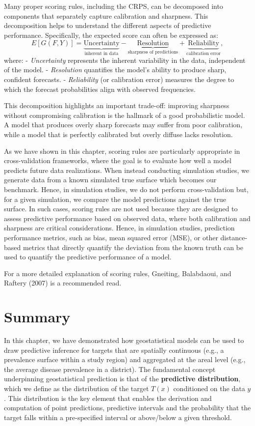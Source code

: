 \documentclass[
  letterpaper,
]{krantz}
\begin{document}
Many proper scoring rules, including the CRPS, can be decomposed into
components that separately capture calibration and sharpness. This
decomposition helps to understand the different aspects of predictive
performance. Specifically, the expected score can often be expressed as:
\[
E[G(F, Y)] = \underbrace{\text{Uncertainty}}_{\text{inherent in data}} - \underbrace{\text{Resolution}}_{\text{sharpness of predictions}} + \underbrace{\text{Reliability}}_{\text{calibration error}},
\] where: - \emph{Uncertainty} represents the inherent variability in
the data, independent of the model. - \emph{Resolution} quantifies the
model's ability to produce sharp, confident forecasts. -
\emph{Reliability} (or calibration error) measures the degree to which
the forecast probabilities align with observed frequencies.

This decomposition highlights an important trade-off: improving
sharpness without compromising calibration is the hallmark of a good
probabilistic model. A model that produces overly sharp forecasts may
suffer from poor calibration, while a model that is perfectly calibrated
but overly diffuse lacks resolution.

As we have shown in this chapter, scoring rules are particularly
appropriate in cross-validation frameworks, where the goal is to
evaluate how well a model predicts future data realizations. When
instead conducting simulation studies, we generate data from a known
simulated true surface which becomes our benchmark. Hence, in simulation
studies, we do not perform cross-validation but, for a given simulation,
we compare the model predictions against the true surface. In such
cases, scoring rules are not used because they are designed to assess
predictive performance based on observed data, where both calibration
and sharpness are critical considerations. Hence, in simulation studies,
prediction performance metrics, such as bias, mean squared error (MSE),
or other distance-based metrics that directly quantify the deviation
from the known truth can be used to quantify the predictive performance
of a model.

For a more detailed explanation of scoring rules, Gneiting, Balabdaoui,
and Raftery (2007) is a recommended read.

\section{Summary}\label{summary}

In this chapter, we have demonstrated how geostatistical models can be
used to draw predictive inference for targets that are spatially
continuous (e.g., a prevalence surface within a study region) and
aggregated at the areal level (e.g., the average disease prevalence in a
district). The fundamental concept underpinning geostatistical
prediction is that of the \textbf{predictive distribution}, which we
define as the distribution of the target \(T(x)\) conditioned on the
data \(y\). This distribution is the key element that enables the
derivation and computation of point predictions, predictive intervals
and the probability that the target falls within a pre-specified
interval or above/below a given threshold.
\end{document}
